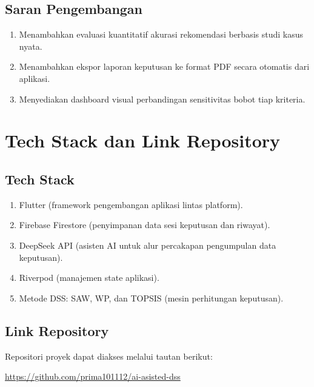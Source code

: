 \documentclass[12pt,a4paper]{article}
\begin{document}
\subsection{Saran Pengembangan}
\begin{enumerate}
  \item Menambahkan evaluasi kuantitatif akurasi rekomendasi berbasis studi kasus nyata.
  \item Menambahkan ekspor laporan keputusan ke format PDF secara otomatis dari aplikasi.
  \item Menyediakan dashboard visual perbandingan sensitivitas bobot tiap kriteria.
\end{enumerate}

\section{Tech Stack dan Link Repository}
\subsection{Tech Stack}
\begin{enumerate}
  \item Flutter (framework pengembangan aplikasi lintas platform).
  \item Firebase Firestore (penyimpanan data sesi keputusan dan riwayat).
  \item DeepSeek API (asisten AI untuk alur percakapan pengumpulan data keputusan).
  \item Riverpod (manajemen state aplikasi).
  \item Metode DSS: SAW, WP, dan TOPSIS (mesin perhitungan keputusan).
\end{enumerate}

\subsection{Link Repository}
Repositori proyek dapat diakses melalui tautan berikut:
\begin{center}
  \url{https://github.com/prima101112/ai-asisted-dss}
\end{center}
\end{document}
